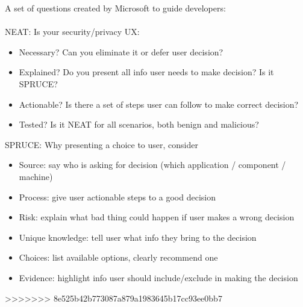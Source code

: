 A set of questions created by Microsoft to guide developers:
\\
\\
NEAT: Is your security/privacy UX:
	\begin{itemize}
		\item Necessary? Can you eliminate it or defer user decision?
		\item Explained? Do you present all info user needs to make decision? Is it SPRUCE?
		\item Actionable? Is there a set of steps user can follow to make correct decision?
		\item Tested? Is it NEAT for all scenarios, both benign and malicious?
	\end{itemize}
SPRUCE: Why presenting a choice to user, consider
	\begin{itemize}
		\item Source: say who is asking for decision (which application / component / machine)
		\item Process: give user actionable steps to a good decision
		\item Risk: explain what bad thing could happen if user makes a wrong decision
		\item Unique knowledge: tell user what info they bring to the decision
		\item Choices: list available options, clearly recommend one
		\item Evidence: highlight info user should include/exclude in making the decision
	\end{itemize}
	
>>>>>>> 8e525b42b773087a879a1983645b17cc93ee0bb7
